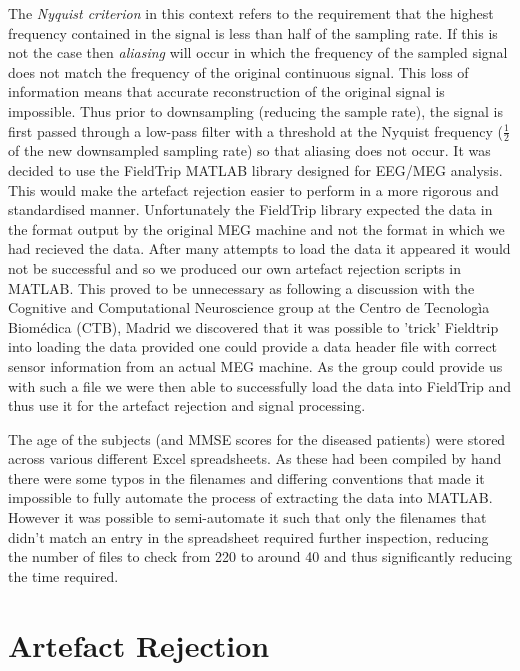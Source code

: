 The \textit{Nyquist criterion} in this context refers to the requirement that the highest frequency contained in the signal is less than half of the sampling rate. If this is not the case then \textit{aliasing} will occur in which the frequency of the sampled signal does not match the frequency of the original continuous signal. This loss of information means that accurate reconstruction of the original signal is impossible. Thus prior to downsampling (reducing the sample rate), the signal is first passed through a low-pass filter with a threshold at the Nyquist frequency ($\frac{1}{2}$ of the new downsampled sampling rate) so that aliasing does not occur. \cite{Smith1999} 
It was decided to use the FieldTrip MATLAB library\cite{Oostenveld2011} designed for EEG/MEG analysis. This would make the artefact rejection easier to perform in a more rigorous and standardised manner. Unfortunately the FieldTrip library expected the data in the format output by the original MEG machine and not the format in which we had recieved the data. After many attempts to load the data it appeared it would not be successful and so we produced our own artefact rejection scripts in MATLAB. This proved to be unnecessary as following a discussion with the Cognitive and Computational Neuroscience group at the Centro de Tecnolog\`{i}a Biom\'{e}dica (CTB), Madrid we discovered that it was possible to 'trick' Fieldtrip into loading the data provided one could provide a data header file with correct sensor information from an actual MEG machine. As the group could provide us with such a file we were then able to successfully load the data into FieldTrip and thus use it for the artefact rejection and signal processing.

The age of the subjects (and MMSE scores for the diseased patients) were stored across various different Excel spreadsheets. As these had been compiled by hand there were some typos in the filenames and differing conventions that made it impossible to fully automate the process of extracting the data into MATLAB. However it was possible to semi-automate it such that only the filenames that didn't match an entry in the spreadsheet required further inspection, reducing the number of files to check from 220 to around 40 and thus significantly reducing the time required.

\section{Artefact Rejection}

